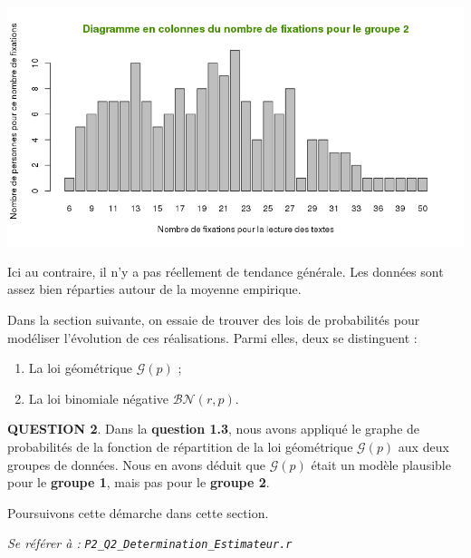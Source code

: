 \documentclass[a4paper,11pt]{article}
\newcommand{\quest}[1]{\small\textbf{#1}\normalsize}
\theoremstyle{nonumberplain}
\theoremstyle{nonumberplain}
\theoremstyle{nonumberplain}
\theoremstyle{nonumberplain}
\begin{document}
      \begin{center}
          \includegraphics[scale=0.75]{images/p2_q1_2.png}
      \end{center}

      Ici au contraire, il n'y a pas réellement de tendance générale. Les données
      sont assez bien réparties autour de la moyenne empirique.

      \medskip
      Dans la section suivante, on essaie de trouver des lois de probabilités pour
      modéliser l'évolution de ces réalisations. Parmi elles, deux se distinguent :

      \begin{enumerate}
          \item La loi géométrique $\mathcal{G}(p)$ ;
          \item La loi binomiale négative $\mathcal{BN}(r, p)$.
      \end{enumerate}

      \quest{QUESTION 2}. Dans la \textbf{question 1.3}, nous avons appliqué le
      graphe de probabilités de la fonction de répartition de la loi géométrique
      $\mathcal{G}(p)$ aux deux groupes de données. Nous en avons déduit que $\mathcal{G}(p)$
      était un modèle plausible pour le \textbf{groupe 1}, mais pas pour le \textbf{groupe 2}.

      \medskip
      Poursuivons cette démarche dans cette section.

      \begin{ref_r}
          \emph{Se référer à :} \texttt{\emph{P2\_Q2\_Determination\_Estimateur.r}}
      \end{ref_r}
\end{document}
